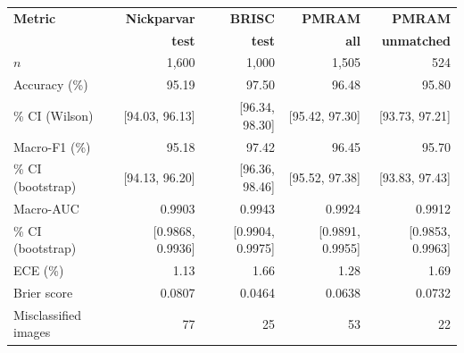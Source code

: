 \begin{tabular}{l r r r r }
\toprule
\textbf{Metric} & \textbf{Nickparvar} & \textbf{BRISC} & \textbf{PMRAM} & \textbf{PMRAM} \\
 & \textbf{test} & \textbf{test} & \textbf{all} & \textbf{unmatched} \\
\midrule
$n$ & 1,600 & 1,000 & 1,505 & 524 \\
Accuracy (\%) & 95.19 & 97.50 & 96.48 & 95.80 \\
\quad 95\% CI (Wilson) & [94.03, 96.13] & [96.34, 98.30] & [95.42, 97.30] & [93.73, 97.21] \\
Macro-F1 (\%) & 95.18 & 97.42 & 96.45 & 95.70 \\
\quad 95\% CI (bootstrap) & [94.13, 96.20] & [96.36, 98.46] & [95.52, 97.38] & [93.83, 97.43] \\
Macro-AUC & 0.9903 & 0.9943 & 0.9924 & 0.9912 \\
\quad 95\% CI (bootstrap) & [0.9868, 0.9936] & [0.9904, 0.9975] & [0.9891, 0.9955] & [0.9853, 0.9963] \\
ECE (\%) & 1.13 & 1.66 & 1.28 & 1.69 \\
Brier score & 0.0807 & 0.0464 & 0.0638 & 0.0732 \\
Misclassified images & 77 & 25 & 53 & 22 \\
\bottomrule
\end{tabular}
